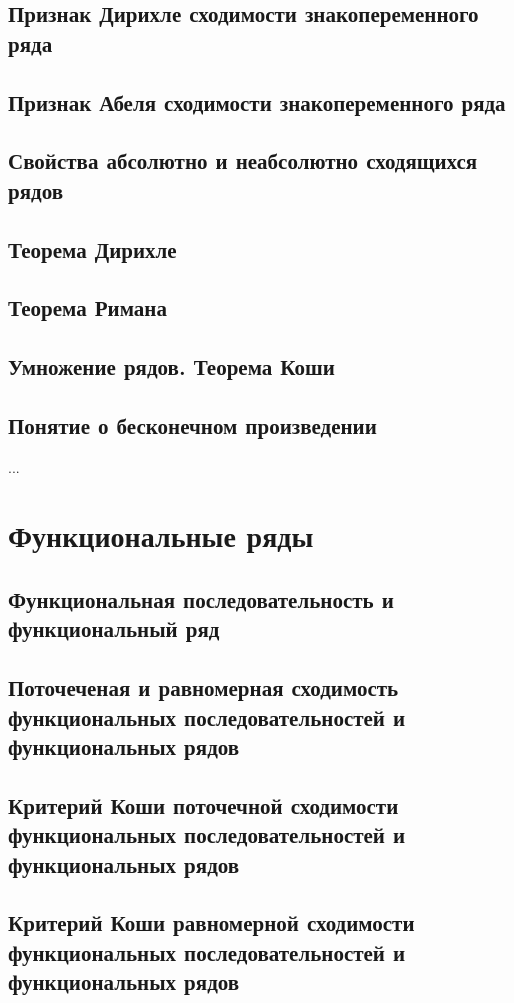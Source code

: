 \subsection{Признак Дирихле сходимости знакопеременного ряда}
\subsection{Признак Абеля сходимости знакопеременного ряда}
\subsection{Свойства абсолютно и неабсолютно сходящихся рядов}
\subsection{Теорема Дирихле}
\subsection{Теорема Римана}
\subsection{Умножение рядов. Теорема Коши}
\subsection{Понятие о бесконечном произведении}
...

\section{Функциональные ряды}
\subsection{Функциональная последовательность и функциональный ряд}
\subsection{Поточеченая и равномерная сходимость функциональных последовательностей и функциональных рядов}
\subsection{Критерий Коши поточечной сходимости функциональных последовательностей и функциональных рядов}
\subsection{Критерий Коши равномерной сходимости функциональных последовательностей и функциональных рядов}

